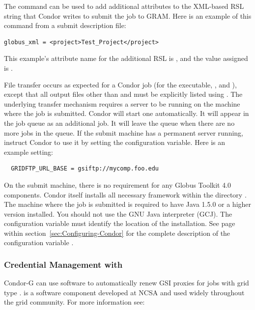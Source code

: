 The  command can be used to add additional
attributes to the XML-based RSL string that Condor writes to submit the
job to GRAM.
Here is an example of this command from a submit description file:
\begin{verbatim}
globus_xml = <project>Test_Project</project>
\end{verbatim}
This example's attribute name for the additional RSL is
, and the value assigned is .

File transfer occurs as expected for a Condor job 
(for the executable, , and ), except that all
output files other than  and  must be
explicitly listed using .
The underlying transfer mechanism requires a  server
to be running on the machine where the job
is submitted. Condor will start one automatically. It will appear in the
job queue as an additional job. It will leave the queue when there are
no more  jobs in the queue.
If the submit machine has a permanent  server running,
instruct Condor to use it by setting the 
configuration variable.  Here is an example setting:
\begin{verbatim}
  GRIDFTP_URL_BASE = gsiftp://mycomp.foo.edu
\end{verbatim}

On the submit machine,
there is no requirement for any Globus Toolkit 4.0 components.
Condor itself installs all necessary framework within the directory 
.
The machine where the job is submitted
is required to
have Java 1.5.0 or a higher version installed.
You should not use the GNU Java interpreter (GCJ).
The configuration variable 
must identify the location of the installation.
See page~\pageref{param:Java} within
section~\ref{sec:Configuring-Condor}
for the complete description of the configuration variable .


\subsubsection{\label{sec:My-Proxy}Credential Management with }
Condor-G can use 
software to automatically renew GSI proxies for
 jobs with grid type
.
 is a software component developed at
NCSA and used widely throughout the grid community.
For more information see:

